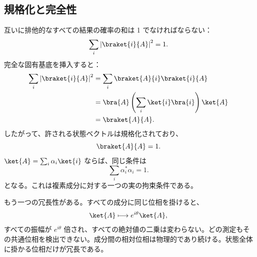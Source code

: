 \begin{classroomqa}
\end{classroomqa}

\subsection{規格化と完全性}

互いに排他的なすべての結果の確率の和は 1 でなければならない：
\begin{equation}
\sum_i\left|\braket{i}{A}\right|^2=1.
\label{eq:probability-normalization}
\end{equation}
完全な固有基底を挿入すると：
\begin{align}
\sum_i\left|\braket{i}{A}\right|^2
 &=\sum_i\braket{A}{i}\braket{i}{A}\\
 &=\bra{A}\left(\sum_i\ket{i}\bra{i}\right)\ket{A}\\
 &=\braket{A}{A}.
\end{align}
したがって、許される状態ベクトルは規格化されており、
\begin{equation}
\braket{A}{A}=1.
\label{eq:state-normalization}
\end{equation}
\(\ket{A}=\sum_i\alpha_i\ket{i}\) ならば、同じ条件は
\begin{equation}
\sum_i\alpha_i^*\alpha_i=1.
\label{eq:component-normalization}
\end{equation}
となる。これは複素成分に対する一つの実の拘束条件である。

\begin{classroomqa}
\end{classroomqa}

もう一つの冗長性がある。すべての成分に同じ位相を掛けると、
\begin{equation}
\ket{A}\longmapsto e^{i\theta}\ket{A},
\label{eq:l3-global-phase}
\end{equation}
すべての振幅が \(e^{i\theta}\) 倍され、すべての絶対値の二乗は変わらない。どの測定もその共通位相を検出できない。成分間の相対位相は物理的であり続ける。状態全体に掛かる位相だけが冗長である。

